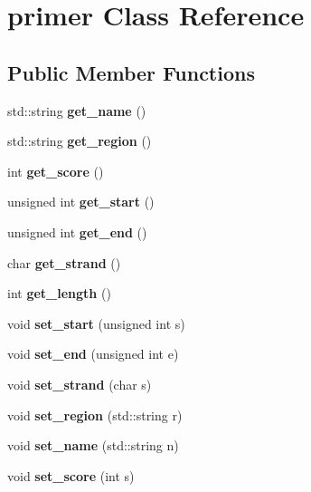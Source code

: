 \hypertarget{classprimer}{}\section{primer Class Reference}
\label{classprimer}
\subsection*{Public Member Functions}
\begin{DoxyCompactItemize}
\item 
\mbox{\label{classprimer_a1b2d7abec533e67dd72bf3f0a3870c9e}} 
std\+::string {\bfseries get\+\_\+name} ()
\item 
\mbox{\label{classprimer_acf13d1bd9646de534e6c9d067ea46607}} 
std\+::string {\bfseries get\+\_\+region} ()
\item 
\mbox{\label{classprimer_afac1709ae9a03760cb42b88b1bee89d6}} 
int {\bfseries get\+\_\+score} ()
\item 
\mbox{\label{classprimer_ae3251d3d0b8e09b959493c2455fa38b8}} 
unsigned int {\bfseries get\+\_\+start} ()
\item 
\mbox{\label{classprimer_a040a92855c7f9efbe0095931c9025e3a}} 
unsigned int {\bfseries get\+\_\+end} ()
\item 
\mbox{\label{classprimer_abaf16a192fed6dda3c5851f733cbffc3}} 
char {\bfseries get\+\_\+strand} ()
\item 
\mbox{\label{classprimer_a9f737712df2d072a6f86c0a25f5780dd}} 
int {\bfseries get\+\_\+length} ()
\item 
\mbox{\label{classprimer_abebcbb7d4caee20e0f4f0dc0877f76e7}} 
void {\bfseries set\+\_\+start} (unsigned int s)
\item 
\mbox{\label{classprimer_ae852484dfc73245e1386474b56c1bc1e}} 
void {\bfseries set\+\_\+end} (unsigned int e)
\item 
\mbox{\label{classprimer_a2356dcadc7ecaf28f8f91285c7015c98}} 
void {\bfseries set\+\_\+strand} (char s)
\item 
\mbox{\label{classprimer_aefa40742e00d1adc20e12bf63938c6cf}} 
void {\bfseries set\+\_\+region} (std\+::string r)
\item 
\mbox{\label{classprimer_a1a5bdefc5283382dc0c5666bb831879a}} 
void {\bfseries set\+\_\+name} (std\+::string n)
\item 
\mbox{\label{classprimer_af8e654b67be26ce681f1b4859f87c62e}} 
void {\bfseries set\+\_\+score} (int s)
\end{DoxyCompactItemize}


